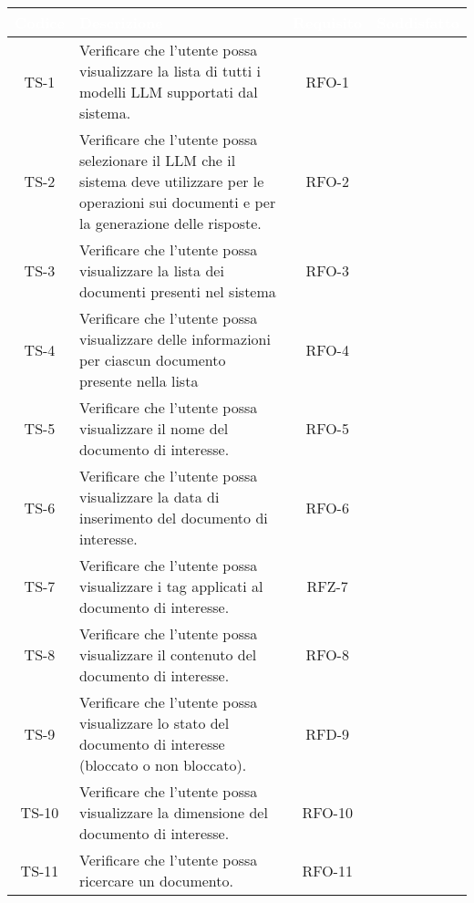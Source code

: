\begingroup
\setlength{\tabcolsep}{10pt}
\renewcommand{\arraystretch}{1.5}
\begin{xltabular}{\textwidth}{| c | X | c | c |}
    \hline
     \textbf{\textcolor{white}{Codice}} & \textbf{\textcolor{white}{Descrizione}} & \textbf{\textcolor{white}{Requisito}} & \textbf{\textcolor{white}{Soddisfatto}}\\
    \hline
    \endhead
    TS-1 & Verificare che l’utente possa visualizzare la lista di tutti i modelli LLM supportati dal sistema. & RFO-1 & \textcolor{cmarkcolor}{} \\
    \hline
    TS-2 & Verificare che l’utente possa selezionare il LLM che il sistema deve utilizzare per le operazioni sui documenti e per la generazione delle risposte. & RFO-2 & \textcolor{cmarkcolor}{} \\
    \hline
    TS-3 & Verificare che l'utente possa visualizzare la lista dei documenti presenti nel sistema & RFO-3 & \textcolor{cmarkcolor}{} \\
    \hline
    TS-4 & Verificare che l'utente possa visualizzare delle informazioni per ciascun documento presente nella lista & RFO-4 & \textcolor{cmarkcolor}{} \\
    \hline
    TS-5 & Verificare che l’utente possa visualizzare il nome del documento di interesse. & RFO-5 & \textcolor{cmarkcolor}{} \\
    \hline
    TS-6 & Verificare che l’utente possa visualizzare la data di inserimento del documento di interesse. & RFO-6 & \textcolor{cmarkcolor}{} \\
    \hline
    TS-7 & Verificare che l’utente possa visualizzare i tag applicati al documento di interesse. & RFZ-7 & \textcolor{cmarkcolor}{} \\
    \hline
    TS-8 & Verificare che l’utente possa visualizzare il contenuto del documento di interesse. & RFO-8 & \textcolor{cmarkcolor}{} \\
    \hline
    TS-9 & Verificare che l’utente possa visualizzare lo stato del documento di interesse (bloccato o non bloccato). & RFD-9 & \textcolor{cmarkcolor}{}\\
    \hline
    TS-10 &  Verificare che l’utente possa visualizzare la dimensione del documento di interesse. & RFO-10 & \textcolor{cmarkcolor}{} \\
    \hline
    TS-11 & Verificare che l’utente possa ricercare un documento. & RFO-11 & \textcolor{cmarkcolor}{} \\

\end{xltabular}

